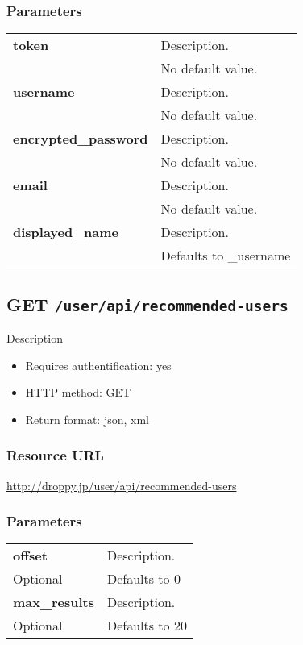 \documentclass[11pt,a4paper]{article}
\newcommand{\content}[1]{\begin{minipage}{10cm}\vspace{2mm}#1\vspace{2mm}\end{minipage}}
\begin{document}
  \subsubsection*{Parameters}
  \begin{table}[h]
    \begin{center}
      \begin{tabular}{l l}
        \hline 
      \textbf{token} & \content{Description. }
      \\
       & No default value.\\
      \hline
      \textbf{username} & \content{Description. }
      \\
       & No default value.\\
      \hline
      \textbf{encrypted\_password} & \content{Description. }
      \\
       & No default value.\\
      \hline
      \textbf{email} & \content{Description. }
      \\
       & No default value.\\
      \hline
      \textbf{displayed\_name} & \content{Description. }
      \\
       & Defaults to \_username\\
      \hline
      \end{tabular}
    \end{center}
  \end{table}
  
      \newpage
      
      
  \subsection*{GET {\tt /user/api/recommended-users}}
  Description
  \begin{itemize}
  \item Requires authentification: yes
  \item HTTP method: GET
  \item Return format: json, xml
  \end{itemize}
  \subsubsection*{Resource URL}
  \url{http://droppy.jp/user/api/recommended-users}
  \subsubsection*{Parameters}
  \begin{table}[h]
    \begin{center}
      \begin{tabular}{l l}
        \hline 
      \textbf{offset} & \content{Description. }
      \\
      Optional & Defaults to 0\\
      \hline
      \textbf{max\_results} & \content{Description. }
      \\
      Optional & Defaults to 20\\
      \hline
      \end{tabular}
    \end{center}
  \end{table}
  
\end{document}

